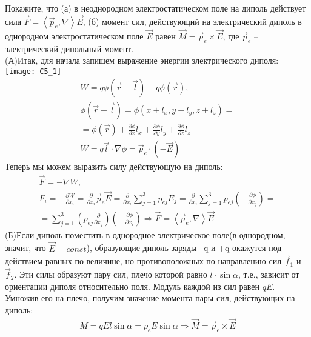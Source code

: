 \documentclass[__main__.tex]{subfiles}
\begin{document}
Покажите, что (а) в неоднородном электростатическом поле на диполь действует сила $\vec{F}=\left<\vec{p}_e,\nabla\right>\vec{E}$, (б) момент сил, действующий на электрический диполь в однородном электростатическом поле $\vec{E}$ равен $\vec{M}=\vec{p}_e\times\vec{E}$, где $\vec{p}_e$ -- электрический дипольный момент.\\ 

(А)Итак, для начала запишем выражение энергии электрического диполя:\\
\texttt{[image: C5\_1]}\\
\begin{gather*}
W = q\phi(\vec{r}+\vec{l})-q\phi(\vec{r}),\\
\phi(\vec{r}+\vec{l}) = \phi(x+l_x,y+l_y,z+l_z)=\\
=\phi(\vec{r})+\frac{\partial \phi}{\partial x}l_x+\frac{\partial \phi}{\partial y}l_y+\frac{\partial \phi}{\partial z}l_z\\
W = q\vec{l} \cdot \nabla \phi = \vec{p}_{e} \cdot (-\vec{E})
\end{gather*}
Теперь мы можем выразить силу действующую на диполь:\\
\begin{gather*}
\vec{F} = -\nabla W,\\
F_i = -\frac{\partial W}{\partial x_i} = \frac{\partial}{\partial x_i}\vec{p}_{e}\vec{E}=\frac{\partial}{\partial x_i}\sum_{j=1}^{3}p_{ej}E_j = \frac{\partial}{\partial x_i} \sum_{j=1}^{3}p_{ej}\left(-\frac{\partial \phi}{\partial x_j}\right) = \\ = \sum_{j=1}^{3}\left(p_{ej}\frac{\partial}{\partial x_j}\right)\left(-\frac{\partial \phi}{\partial x_i}\right) \Longrightarrow \vec{F} = \left<\vec{p}_{e}, \nabla\right>\vec{E}
\end{gather*}
(Б)Если диполь поместить в однородное электрическое поле(в однородном, значит, что $\vec{E} = const$), образующие диполь заряды –q и +q окажутся под действием равных по величине, но противоположных по направлению сил $\vec{f}_1$ и $\vec{f}_2$. Эти силы образуют пару сил, плечо которой равно $l \cdot \sin \alpha$, т.е., зависит от ориентации диполя относительно поля. Модуль каждой из сил равен $qE$. Умножив его на плечо, получим значение момента пары сил, действующих на диполь:
\begin{gather}
M =qEl\sin \alpha = p_eE\sin \alpha \Longrightarrow \vec{M} = \vec{p}_e \times \vec{E}
\end{gather}
\end{document}
